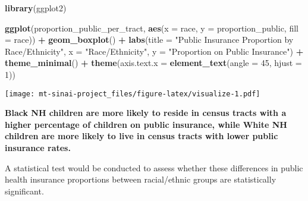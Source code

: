 \documentclass[
]{article}
\newenvironment{Shaded}{\begin{snugshade}}{\end{snugshade}}
\newcommand{\AttributeTok}[1]{\textcolor[rgb]{0.13,0.29,0.53}{#1}}
\newcommand{\DecValTok}[1]{\textcolor[rgb]{0.00,0.00,0.81}{#1}}
\newcommand{\FunctionTok}[1]{\textcolor[rgb]{0.13,0.29,0.53}{\textbf{#1}}}
\newcommand{\NormalTok}[1]{#1}
\newcommand{\SpecialCharTok}[1]{\textcolor[rgb]{0.81,0.36,0.00}{\textbf{#1}}}
\newcommand{\StringTok}[1]{\textcolor[rgb]{0.31,0.60,0.02}{#1}}
\begin{document}
\begin{Shaded}
\begin{Highlighting}[]
\FunctionTok{library}\NormalTok{(ggplot2)}

\FunctionTok{ggplot}\NormalTok{(proportion\_public\_per\_tract, }\FunctionTok{aes}\NormalTok{(}\AttributeTok{x =}\NormalTok{ race, }\AttributeTok{y =}\NormalTok{ proportion\_public, }\AttributeTok{fill =}\NormalTok{ race)) }\SpecialCharTok{+}
  \FunctionTok{geom\_boxplot}\NormalTok{() }\SpecialCharTok{+}
  \FunctionTok{labs}\NormalTok{(}\AttributeTok{title =} \StringTok{"Public Insurance Proportion by Race/Ethnicity"}\NormalTok{,}
       \AttributeTok{x =} \StringTok{"Race/Ethnicity"}\NormalTok{,}
       \AttributeTok{y =} \StringTok{"Proportion on Public Insurance"}\NormalTok{) }\SpecialCharTok{+}
  \FunctionTok{theme\_minimal}\NormalTok{() }\SpecialCharTok{+}
  \FunctionTok{theme}\NormalTok{(}\AttributeTok{axis.text.x =} \FunctionTok{element\_text}\NormalTok{(}\AttributeTok{angle =} \DecValTok{45}\NormalTok{, }\AttributeTok{hjust =} \DecValTok{1}\NormalTok{))}
\end{Highlighting}
\end{Shaded}

\texttt{[image: mt-sinai-project\_files/figure-latex/visualize-1.pdf]}

\textbf{Black NH children are more likely to reside in census tracts
with a higher percentage of children on public insurance, while White NH
children are more likely to live in census tracts with lower public
insurance rates.}

A statistical test would be conducted to assess whether these
differences in public health insurance proportions between racial/ethnic
groups are statistically significant.
\end{document}
